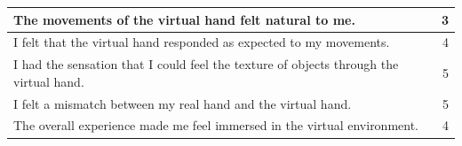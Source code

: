 \documentclass[uplatex,
12pt, %
a4paper,
english, %
oneside,
titlepage,
singlespacing, %
liststotoc, %
headsepline,
]{MastersDoctoralThesis} %
\begin{document}
\begin{appendices}
\begin{table}[H]
\begin{tabular}{|lrrrrrrrr|r|}
    \midrule
    \multicolumn{9}{|l|}{The movements of the virtual hand felt natural to me.} & 3 \\
    \midrule
    \multicolumn{9}{|l|}{I felt that the virtual hand responded as expected to my movements.} & 4 \\
    \midrule
    \multicolumn{9}{|l|}{I had the sensation that I could feel the texture of objects through the virtual hand.} & 5 \\
    \midrule
    \multicolumn{9}{|l|}{I felt a mismatch between my real hand and the virtual hand. } & 5 \\
    \midrule
    \multicolumn{9}{|l|}{The overall experience made me feel immersed in the virtual environment.} & 4 \\
    \bottomrule
    \end{tabular}%
  \label{tab:Q_1}%
\end{table}%


\end{appendices}
\end{document}
